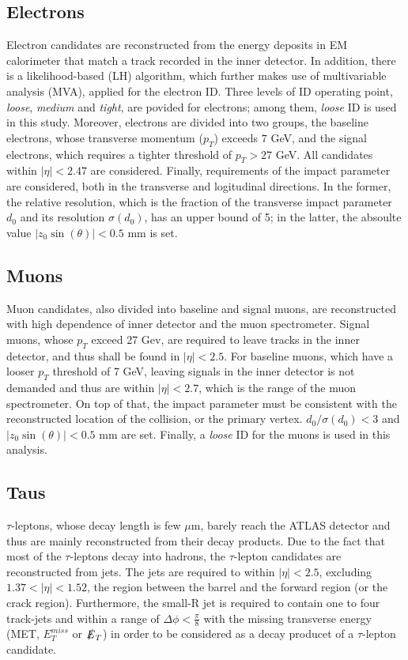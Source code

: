 \documentclass[class=NCU_thesis, crop=false]{standalone}
\begin{document}
	\subsection{Electrons}
		Electron candidates are reconstructed from the energy deposits in EM calorimeter that match a track recorded in the inner detector. In addition, there is a likelihood-based (LH) algorithm, which further makes use of multivariable analysis (MVA), applied for the electron ID. Three levels of ID operating point, \textit{loose}, \textit{medium} and \textit{tight}, are povided for electrons; among them, \textit{loose} ID is used in this study. Moreover, electrons are divided into two groups, the baseline electrons, whose transverse momentum ($p_T$) exceeds $7$ GeV, and the signal electrons, which requires a tighter threshold of $p_T > 27$ GeV. All candidates within $\lvert \eta \rvert < 2.47$ are considered. Finally, requirements of the impact parameter are considered, both in the transverse and logitudinal directions. In the former, the relative resolution, which is the fraction of the transverse impact parameter $d_0$ and its resolution $\sigma(d_0)$, has an upper bound of 5; in the latter, the absoulte value $\lvert z_0 \sin(\theta) \rvert < 0.5$ mm is set.
		
	\subsection{Muons}
		Muon candidates, also divided into baseline and signal muons, are reconstructed with high dependence of inner detector and the muon spectrometer. Signal muons, whose $p_T$ exceed 27 Gev, are required to leave tracks in the inner detector, and thus shall be found in $\lvert \eta \rvert < 2.5$. For baseline muons, which have a looser $p_T$ threshold of 7 GeV, leaving signals in the inner detector is not demanded and thus are within $\lvert \eta \rvert < 2.7$, which is the range of the muon spectrometer. On top of that, the impact parameter must be consistent with the reconstructed location of the collision, or the primary vertex. $d_0 / \sigma(d_0) < 3$ and $\lvert z_0 \sin(\theta) \rvert < 0.5$ mm are set. Finally, a \textit{loose} ID for the muons is used in this analysis.
		
	\subsection{Taus}
		$\tau$-leptons, whose decay length is few $\mu$m, barely reach the ATLAS detector and thus are mainly reconstructed from their decay products. Due to the fact that most of the $\tau$-leptons decay into hadrons, the $\tau$-lepton candidates are reconstructed from jets. The jets are required to within $\lvert \eta \rvert < 2.5$, excluding $1.37 < \lvert \eta \rvert < 1.52$, the region between the barrel and the forward region (or the crack region). Furthermore, the small-R jet is required to contain one to four track-jets and within a range of $\Delta \phi < \frac{\pi}{8}$ with the missing transverse energy (MET, $E_T^{miss}$ or $\slashed{E}_T$) in order to be considered as a decay producet of a $\tau$-lepton candidate.
\end{document}
